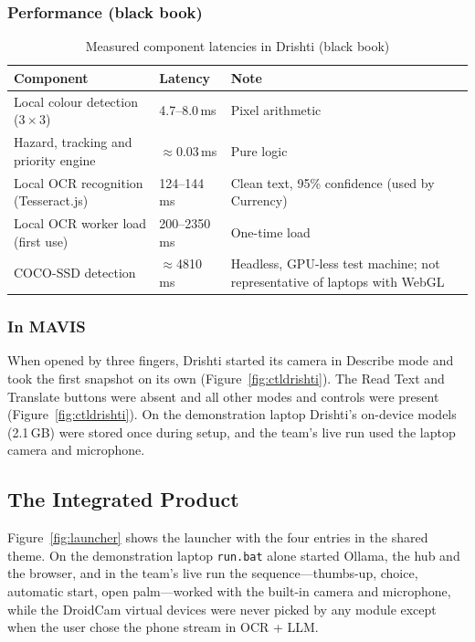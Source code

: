 \documentclass[12pt,singleside,a4paper]{article}
\begin{document}
\subsubsection{Performance (black book)}
\begin{table}[H]
\centering
\caption{Measured component latencies in Drishti (black book)}
\label{tab:drperf}
\small
\begin{tabularx}{\textwidth}{@{}p{5.6cm}p{3.2cm}X@{}}
\toprule
\textbf{Component} & \textbf{Latency} & \textbf{Note} \\
\midrule
Local colour detection ($3\times3$) & 4.7--8.0\,ms & Pixel arithmetic \\
Hazard, tracking and priority engine & $\approx$0.03\,ms & Pure logic \\
Local OCR recognition (Tesseract.js) & 124--144\,ms & Clean text, 95\% confidence (used by Currency) \\
Local OCR worker load (first use) & 200--2350\,ms & One-time load \\
COCO-SSD detection & $\approx$4810\,ms & Headless, GPU-less test machine; not representative of laptops with WebGL \\
\bottomrule
\end{tabularx}
\end{table}

\subsubsection{In MAVIS}
When opened by three fingers, Drishti started its camera in Describe mode and took the first snapshot on its own (Figure~\ref{fig:ctldrishti}). The Read Text and Translate buttons were absent and all other modes and controls were present (Figure~\ref{fig:ctldrishti}). On the demonstration laptop Drishti's on-device models (2.1\,GB) were stored once during setup, and the team's live run used the laptop camera and microphone.



\subsection{The Integrated Product}
Figure~\ref{fig:launcher} shows the launcher with the four entries in the shared theme. On the demonstration laptop \texttt{run.bat} alone started Ollama, the hub and the browser, and in the team's live run the sequence---thumbs-up, choice, automatic start, open palm---worked with the built-in camera and microphone, while the DroidCam virtual devices were never picked by any module except when the user chose the phone stream in OCR + LLM.
\end{document}
